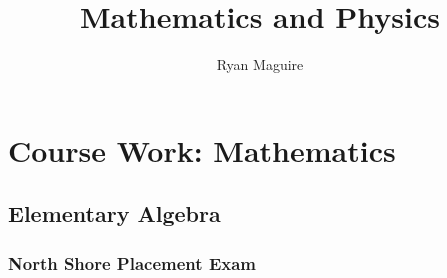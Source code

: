 \documentclass[oneside]{book}
\title{Mathematics and Physics}
\author{Ryan Maguire}
\date{\vspace{-5ex}}
\theoremstyle{mystyle}
\begin{document}
\maketitle
\tableofcontents
\listoffigures
\listoftables
\clearpage
\setlength{\parindent}{0em}
\setlength{\parskip}{0em}
\part{Course Work: Mathematics}
\chapter{Elementary Algebra}
\section{North Shore Placement Exam}
\end{document}
